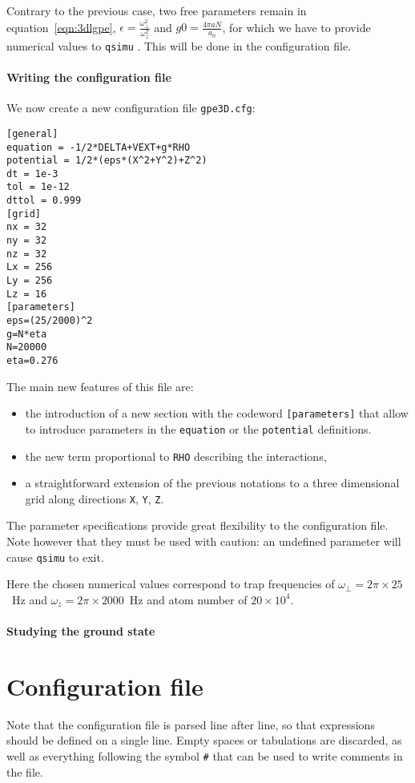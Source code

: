 \documentclass[12pt,a4paper]{report}
\newcommand{\qsimu}{\texttt{qsimu}{} }
\begin{document}
Contrary to the previous case, two free parameters remain in equation~\eqref{eqn:3dlgpe}, $\epsilon=\frac{\omega_\perp^2}{\omega_z^2}$ and $g0=\frac{4\pi aN}{a_0}$, for which we have to provide numerical values to \qsimu.
This will be done in the configuration file.

\subsubsection{Writing the configuration file}
We now create a new configuration file \texttt{gpe3D.cfg}:
\begin{verbatim}
[general]
equation = -1/2*DELTA+VEXT+g*RHO
potential = 1/2*(eps*(X^2+Y^2)+Z^2)
dt = 1e-3
tol = 1e-12
dttol = 0.999
[grid]
nx = 32
ny = 32
nz = 32
Lx = 256
Ly = 256
Lz = 16
[parameters]
eps=(25/2000)^2
g=N*eta
N=20000
eta=0.276
\end{verbatim}
The main new features of this file are:
\begin{itemize}
\item the introduction of a new section with the codeword \texttt{[parameters]} that allow to introduce parameters in the \texttt{equation} or the \texttt{potential} definitions.
\item the new term proportional to \texttt{RHO} describing the interactions,
\item a straightforward extension of the previous notations to a three dimensional grid along directions \texttt{X}, \texttt{Y}, \texttt{Z}.
\end{itemize}
The parameter specifications provide great flexibility to the configuration file.
Note however that they must be used with caution: an undefined parameter will cause \qsimu to exit.

Here the chosen numerical values correspond to trap frequencies of $\omega_\perp=2\pi\times25$~Hz and $\omega_z=2\pi\times2000$~Hz and atom number of $20\times10^4$.

\subsubsection{Studying the ground state}

\chapter{Configuration file}
Note that the configuration file is parsed line after line, so that expressions should be defined on a single line. Empty spaces or tabulations are discarded, as well as everything following the symbol \texttt{\#} that can be used to write comments in the file.
\end{document}
